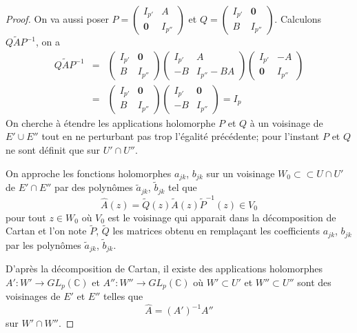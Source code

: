 \documentclass{article}
\theoremstyle{definition}
\theoremstyle{remark}
\begin{document}
\begin{proof}
On va aussi poser $P = \begin{pmatrix}
   I_{p'} & A \\
   \mathbf{0} & I_{p''} 
\end{pmatrix}$
et $Q = \begin{pmatrix}
   I_{p'} & \mathbf{0} \\
   B & I_{p''} 
\end{pmatrix}$. Calculons $Q\tilde{A}P^{-1}$, on a
\begin{eqnarray}
\nonumber Q\tilde{A}P^{-1} &=& \begin{pmatrix}
   I_{p'} & \mathbf{0} \\
   B & I_{p''} 
\end{pmatrix}
\begin{pmatrix}
   I_{p'} & A \\
   -B & I_{p''} - BA 
\end{pmatrix}
\begin{pmatrix}
   I_{p'} & -A \\
   \mathbf{0} & I_{p''} 
\end{pmatrix} \\
\nonumber &=& \begin{pmatrix}
   I_{p'} & \mathbf{0} \\
   B & I_{p''} 
\end{pmatrix}\begin{pmatrix}
   I_{p'} & \mathbf{0} \\
   -B & I_{p''} 
\end{pmatrix} = I_p
\end{eqnarray}
On cherche à étendre les applications holomorphe $P$ et $Q$ à un voisinage de $E' \cup E''$ tout en ne perturbant pas trop l'égalité précédente; pour l'instant $P$ et $Q$ ne sont définit que sur $U' \cap U''$.

On approche les fonctions holomorphes $a_{jk}$, $b_{jk}$ sur un voisinage $W_0 \subset \subset U \cap U'$ de $E'\cap E''$ par des polynômes $\tilde{a}_{jk}$, $\tilde{b}_{jk}$ tel que $$\hat{A}(z) = \tilde{Q}(z)\tilde{A}(z)\tilde{P}^{-1}(z) \in V_0$$ pour tout $z \in W_0$ où $V_0$ est le voisinage qui apparait dans la décomposition de Cartan et l'on note $\tilde{P}$, $\tilde{Q}$ les matrices obtenu en remplaçant les coefficients $a_{jk}$, $b_{jk}$ par les polynômes $\tilde{a}_{jk}$, $\tilde{b}_{jk}$.

D'après la décomposition de Cartan, il existe des applications holomorphes $A' : W' \to GL_p(\mathbb{C})$ et $A'' : W'' \to GL_p(\mathbb{C})$ où $W' \subset U'$ et $W'' \subset U''$ sont des voisinages de $E'$ et $E''$ telles que $$\hat{A} = (A')^{-1}A''$$ sur $W' \cap W''$.


\end{proof}
\end{document}
